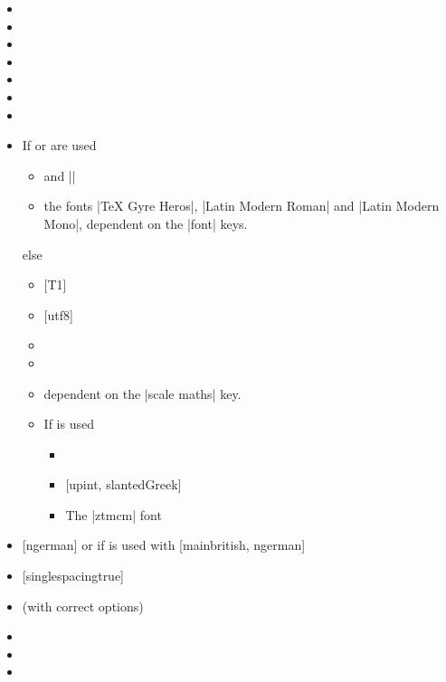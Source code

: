 \begin{multicols}{2}%
  \begin{itemize}[leftmargin=10pt]
    \item {}
    \item {}
    \item {}
    \item {}
    \item {}
    \item {}
    \item {}
    \item If  or  are used
      \begin{itemize}[topsep=0pt]
        \item {} and \bverb||
        \item the fonts \bverb|TeX Gyre Heros|, \bverb|Latin Modern Roman| and
          \bverb|Latin Modern Mono|, dependent on the |font| keys.
      \end{itemize}
      else
      \begin{itemize}[topsep=0pt]
        \item {} [T1]
        \item {} [utf8]
        \item {}
        \item {}
        \item {} dependent on the \bverb|scale maths| key.
        \item If  is used
          \begin{itemize}
            \item {}
            \item {} [upint, slantedGreek]
            \item The |ztmcm| font
          \end{itemize}
      \end{itemize}
    \item {} [ngerman] or if  is used with
      [main\Seq british, ngerman]
    \item {} [singlespacing\Seq true]
    \item {} (with correct options)
    \item {}
    \item {}
    \item {}

\end{itemize}
\end{multicols}
